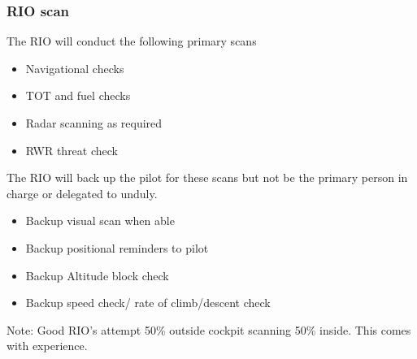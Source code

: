 \subsubsection{RIO scan}

The RIO will conduct the following primary scans

\begin{itemize}
  \item Navigational checks
  \item TOT and fuel checks
  \item Radar scanning as required
  \item RWR threat check
\end{itemize}

The RIO will back up the pilot for these scans but not be the primary person in
charge or delegated to unduly.

\begin{itemize}
  \item Backup visual scan when able
  \item Backup positional reminders to pilot
  \item Backup Altitude block check
  \item Backup speed check/ rate of climb/descent check
\end{itemize}

Note: Good RIO's attempt 50\% outside cockpit scanning 50\% inside. This comes
with experience.

